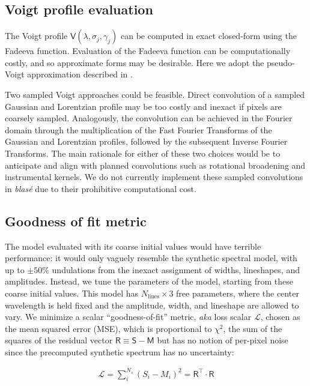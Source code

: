 \documentclass[modern]{aastex631}
\begin{document}
\subsection{Voigt profile evaluation}
The Voigt profile $\mathsf{V}(\lambda, \sigma_j, \gamma_j)$ can be computed in exact closed-form using the Fadeeva function. Evaluation of the Fadeeva function can be computationally costly, and so approximate forms may be desirable. Here we adopt the pseudo-Voigt approximation described in .

Two sampled Voigt approaches could be feasible. Direct convolution of a sampled Gaussian and Lorentzian profile may be too costly and inexact if pixels are coarsely sampled. Analogously, the convolution can be achieved in the Fourier domain through the multiplication of the Fast Fourier Transforms of the Gaussian and Lorentzian profiles, followed by the subsequent Inverse Fourier Transforms. The main rationale for either of these two choices would be to anticipate and align with planned convolutions such as rotational broadening and instrumental kernels. We do not currently implement these sampled convolutions in \emph{blas\'e} due to their prohibitive computational cost.


\subsection{Goodness of fit metric}
The model evaluated with its coarse initial values would have terrible performance: it would only vaguely resemble the synthetic spectral model, with up to $\pm 50\%$ undulations from the inexact assignment of widths, lineshapes, and amplitudes. Instead, we tune the parameters of the model, starting from these coarse initial values. This model has $N_{\mathrm{lines}}\times 3$ free parameters, where the center wavelength is held fixed and the amplitude, width, and lineshape are allowed to vary. We minimize a scalar ``goodness-of-fit'' metric, \emph{aka} loss scalar $\mathcal{L}$, chosen as the mean squared error (MSE), which is proportional to $\chi^2$, the sum of the squares of the residual vector $\mathsf{R} \equiv \mathsf{S}-\mathsf{M}$ but has no notion of per-pixel noise since the precomputed synthetic spectrum has no uncertainty:

\begin{eqnarray}
    \mathcal{L} = \sum_i^{N_s} (S_i - M_i)^2 = \mathsf{R^\intercal}\cdot \mathsf{R}
\end{eqnarray}
\end{document}
